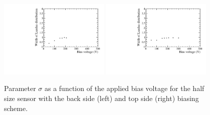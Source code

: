 \begin{figure}[]
\centering
\includegraphics[width=0.47\textwidth]{figs/SNRvsBias/cwidthvsBias_F1_FanUp_Back.pdf}
\includegraphics[width=0.47\textwidth]{figs/SNRvsBias/cwidthvsBias_F1_FanUp_Top.pdf}
\caption[Parameter $\sigma$ as a function of the applied bias voltage for the half size sensor.]{Parameter $\sigma$ as a function of the applied bias voltage for the half size sensor with the back side (left) and top side (right) biasing scheme.}
\label{fig:DepletionVoltage2F}
\end{figure}